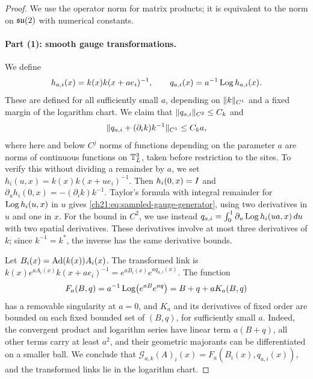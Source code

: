 \begin{proof}
We use the operator norm for matrix products; it is equivalent to the norm on $\mathfrak{su}(2)$ with numerical constants.

\paragraph{Part (1): smooth gauge transformations.}
We define
\[
 h_{a,i}(x)=k(x)k(x+ae_i)^{-1},\qquad q_{a,i}(x)=a^{-1}\operatorname{Log} h_{a,i}(x).
\]
These are defined for all sufficiently small $a$, depending on $\lVert k\rVert_{C^1}$ and a fixed margin of the logarithm chart. We claim that $\lVert q_{a,i}\rVert_{C^2}\le C_k$ and
\begin{equation}\label{ch21:eq:sampled-gauge-generator}
 \lVert q_{a,i}+(\partial_ik)k^{-1}\rVert_{C^1}\le C_ka,
\end{equation}
where here and below $C^j$ norms of functions depending on the parameter $a$ are norms of continuous functions on $\mathbb T_L^3$, taken before restriction to the sites. To verify this without dividing a remainder by $a$, we set $h_i(u,x)=k(x)k(x+ue_i)^{-1}$. Then $h_i(0,x)=I$ and $\partial_uh_i(0,x)=-(\partial_ik)k^{-1}$. Taylor's formula with integral remainder for $\operatorname{Log} h_i(u,x)$ in $u$ gives \eqref{ch21:eq:sampled-gauge-generator}, using two derivatives in $u$ and one in $x$. For the bound in $C^2$, we use instead $q_{a,i}=\int_0^1\partial_u\operatorname{Log} h_i(ua,x)\,du$ with two spatial derivatives. These derivatives involve at most three derivatives of $k$; since $k^{-1}=k^*$, the inverse has the same derivative bounds.

Let $B_i(x)=\operatorname{Ad}(k(x))A_i(x)$. The transformed link is $k(x)e^{aA_i(x)}k(x+ae_i)^{-1}=e^{aB_i(x)}e^{aq_{a,i}(x)}$. The function
\[
 F_a(B,q)=a^{-1}\operatorname{Log}\bigl(e^{aB}e^{aq}\bigr)=B+q+aK_a(B,q)
\]
has a removable singularity at $a=0$, and $K_a$ and its derivatives of fixed order are bounded on each fixed bounded set of $(B,q)$, for sufficiently small $a$. Indeed, the convergent product and logarithm series have linear term $a(B+q)$, all other terms carry at least $a^2$, and their geometric majorants can be differentiated on a smaller ball. We conclude that $\mathscr G_{a,k}(A)_i(x)=F_a(B_i(x),q_{a,i}(x))$, and the transformed links lie in the logarithm chart.


\end{proof}

